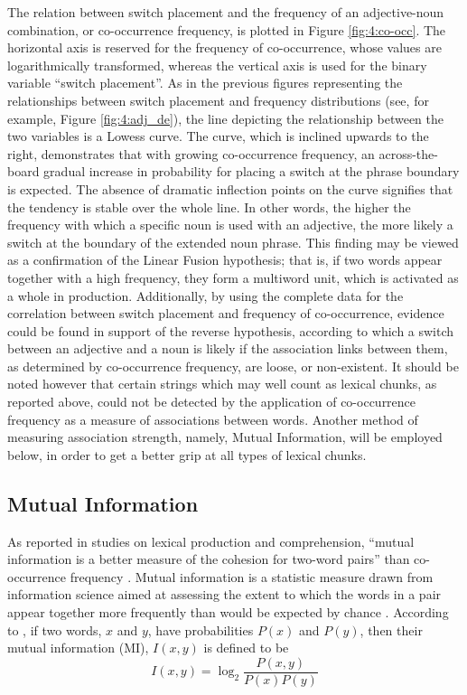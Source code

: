 The relation between switch placement and the frequency of an adjective-noun combination, or co-occurrence frequency, is plotted in Figure \ref{fig:4:co-occ}. The horizontal axis is reserved for the frequency of co-occurrence, whose values are logarithmically transformed, whereas the vertical axis is used for the binary variable “switch placement”. As in the previous figures representing the relationships between switch placement and frequency distributions (see, for example, Figure \ref{fig:4:adj_de}), the line depicting the relationship between the two variables is a Lowess curve. The curve, which is inclined upwards to the right, demonstrates that with growing co-occurrence frequency, an across-the-board gradual increase in probability for placing a switch at the phrase boundary is expected. The absence of dramatic inflection points on the curve signifies that the tendency is stable over the whole line. In other words, the higher the frequency with which a specific noun is used with an adjective, the more likely a switch at the boundary of the extended noun phrase. This finding may be viewed as a confirmation of the Linear Fusion hypothesis; that is, if two words appear together with a high frequency, they form a multiword unit, which is activated as a whole in production. Additionally, by using the complete data for the correlation between switch placement and frequency of co-occurrence, evidence could be found in support of the reverse hypothesis, according to which a switch between an adjective and a noun is likely if the association links between them, as determined by co-occurrence frequency, are loose, or non-existent. It should be noted however that certain strings which may well count as lexical chunks, as reported above, could not be detected by the application of co-occurrence frequency as a measure of associations between words. Another method of measuring association strength, namely, Mutual Information, will be employed below, in order to get a better grip at all types of lexical chunks.

\subsection{Mutual Information}

As reported in studies on lexical production and comprehension, ``mutual information is a better measure of the cohesion for two-word pairs'' \citep{gregory-etal-1999} than co-occurrence frequency \citep[cf.][]{ellis-formulaic-2008}. Mutual information is a statistic measure drawn from information science aimed at assessing the extent to which the words in a pair appear together more frequently than would be expected by chance \citep{oakes-1998, manning-schuetze-1999, wiechmann-2008}. According to \citet{fano-1961}, if two words, $x$ and $y$, have probabilities $P(x)$ and $P(y)$, then their mutual information (MI), $I(x,y)$ is defined to be \[ I(x, y) = \log_2 \frac{P(x,y)}{P(x)P(y)} \]

